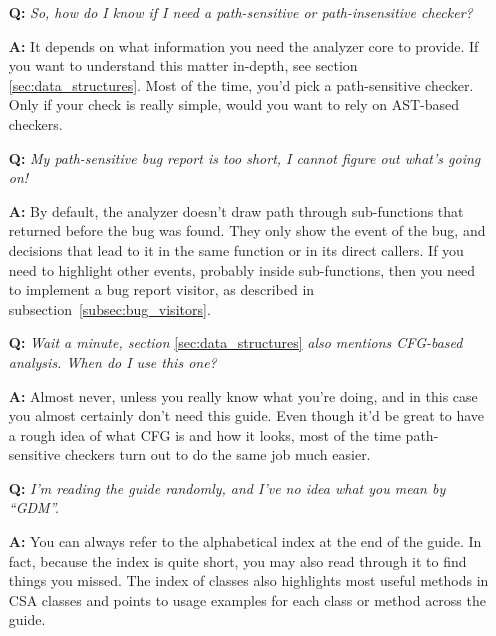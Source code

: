 \documentclass[a4paper,12pt]{article}
\begin{document}
\begin{itemize}
\item[\textbf{Q:}] \emph{So, how do I know if I need a path-sensitive or path-insensitive checker?}
\item[\textbf{A:}] It depends on what information you need the analyzer core to provide. If you want to understand this matter in-depth, see section \ref{sec:data_structures}. Most of the time, you'd pick a path-sensitive checker. Only if your check is really simple, would you want to rely on AST-based checkers.
\end{itemize}
\medskip

\begin{itemize}
\item[\textbf{Q:}] \emph{My path-sensitive bug report is too short, I cannot figure out what's going on!}
\item[\textbf{A:}] By default, the analyzer doesn't draw path through sub-functions that returned before the bug was found. They only show the event of the bug, and decisions that lead to it in the same function or in its direct callers. If you need to highlight other events, probably inside sub-functions, then you need to implement a bug report visitor, as described in subsection~\ref{subsec:bug_visitors}.
\end{itemize}
\medskip

\begin{itemize}
\item[\textbf{Q:}] \emph{Wait a minute, section} \ref{sec:data_structures} \emph{also mentions CFG-based analysis. When do I use this one?}
\item[\textbf{A:}] Almost never, unless you really know what you're doing, and in this case you almost certainly don't need this guide. Even though it'd be great to have a rough idea of what CFG is and how it looks, most of the time path-sensitive checkers turn out to do the same job much easier.
\end{itemize}
\medskip

\begin{itemize}
\item[\textbf{Q:}] \emph{I'm reading the guide randomly, and I've no idea what you mean by ``GDM''.}
\item[\textbf{A:}] You can always refer to the alphabetical index at the end of  the guide. In fact, because the index is quite short, you may also read through it to find things you missed. The index of classes also highlights most useful methods in CSA classes and points to usage examples for each class or method across the guide.
\end{itemize}
\medskip
\end{document}
